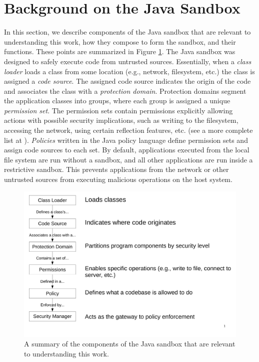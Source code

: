 \documentclass{sig-alternate}
\begin{document}
\section{Background on the Java Sandbox}\label{sec:Background}

In this section, we describe components of the Java sandbox that are
relevant to understanding this work, how they compose to form the
sandbox, and their functions. These points are summarized in Figure
\ref{fig:Sandbox-high-level-summary}. The Java sandbox was designed
to safely execute code from untrusted sources. Essentially, when a
\textit{class loader} loads a class from some location (e.g., network,
filesystem, etc.) the class is assigned a \textit{code source}. The
assigned code source indicates the origin of the code and associates
the class with a \textit{protection domain}. Protection domains segment
the application classes into groups, where each group is assigned
a unique \textit{permission set}. The permission sets contain permissions
explicitly allowing actions with possible security implications, such
as writing to the filesystem, accessing the network, using certain
reflection features, etc. (see a more complete list at \cite{_permissions_2014}).
\emph{Policies} written in the Java policy language \cite{_java_policy_language}
define permission sets and assign code sources to each set. By default,
applications executed from the local file system are run without a
sandbox, and all other applications are run inside a restrictive sandbox.
This prevents applications from the network or other untrusted sources
from executing malicious operations on the host system. 

\begin{figure}
\includegraphics[scale=0.3]{sandbox_overview}

\caption{A summary of the components of the Java sandbox that are relevant
to understanding this work.}
\label{fig:Sandbox-high-level-summary}
\end{figure}
\end{document}

